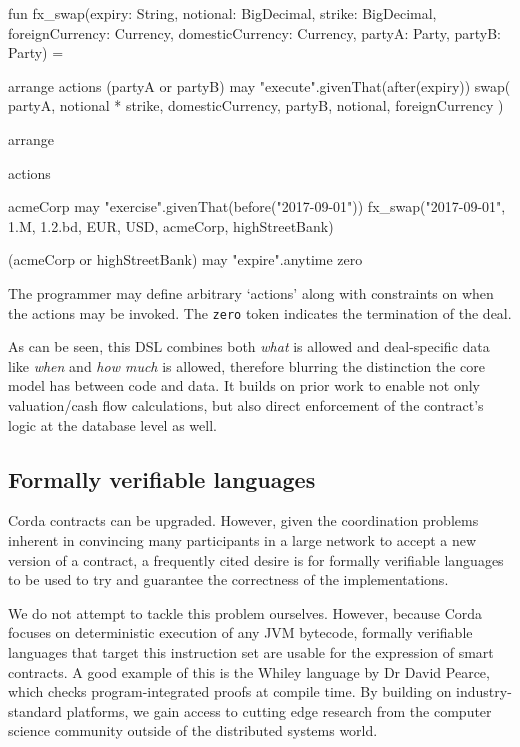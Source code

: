 \documentclass{article}
\begin{document}
\begin{kotlincode}
fun fx_swap(expiry: String, notional: BigDecimal,
            strike: BigDecimal, foreignCurrency: Currency,
            domesticCurrency: Currency,
            partyA: Party, partyB: Party) =

        arrange {
            actions {
                (partyA or partyB) may {
                    "execute".givenThat(after(expiry)) {
                        swap(
                            partyA, notional * strike,
                            domesticCurrency, partyB,
                            notional, foreignCurrency
                        )
                    }
                }
            }
        }

arrange {
    actions {
        acmeCorp may {
            "exercise".givenThat(before("2017-09-01")) {
                fx_swap("2017-09-01", 1.M, 1.2.bd, EUR, USD,
                        acmeCorp, highStreetBank)
            }
        }

        (acmeCorp or highStreetBank) may {
            "expire".anytime {
                zero
            }
        }
    }
}
\end{kotlincode}

The programmer may define arbitrary `actions' along with constraints on when the actions may be invoked. The
\texttt{zero} token indicates the termination of the deal.

As can be seen, this DSL combines both \emph{what} is allowed and deal-specific data like \emph{when} and \emph{how much}
is allowed, therefore blurring the distinction the core model has between code and data. It builds on prior work
to enable not only valuation/cash flow calculations, but also direct enforcement of the contract's logic at the
database level as well.

\subsection{Formally verifiable languages}

Corda contracts can be upgraded. However, given the coordination problems inherent in convincing many participants
in a large network to accept a new version of a contract, a frequently cited desire is for formally verifiable
languages to be used to try and guarantee the correctness of the implementations.

We do not attempt to tackle this problem ourselves. However, because Corda focuses on deterministic execution of
any JVM bytecode, formally verifiable languages that target this instruction set are usable for the expression
of smart contracts. A good example of this is the Whiley language by Dr David Pearce\cite{Pearce2015191}, which
checks program-integrated proofs at compile time. By building on industry-standard platforms, we gain access to
cutting edge research from the computer science community outside of the distributed systems world.
\end{document}
